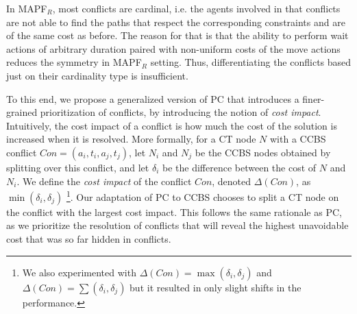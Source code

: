 \documentclass[letterpaper]{article} %
\newcommand{\cbs}{\ac{CBS}\xspace}
\newcommand{\ccbs}{\ac{CCBS}\xspace}
\newcommand{\ct}{\ac{CT}\xspace}
\newcommand{\mapfr}{{MAPF}$_R$\xspace}
\newcommand{\pc}{\ac{PC}\xspace}
\begin{document}
In \mapfr, most conflicts are cardinal, i.e. the agents involved in that conflicts are not able to find the paths that respect the corresponding constraints and are of the same cost as before. The reason for that is that the ability to perform wait actions of arbitrary duration paired with non-uniform costs of the move actions reduces the symmetry in \mapfr setting.
Thus, differentiating the conflicts based just on their cardinality type is insufficient.


To this end, we propose a generalized version of \pc that introduces a finer-grained prioritization of conflicts, by introducing the notion of \emph{cost impact}.
Intuitively, the cost impact of a conflict is how much the cost of the solution is increased when it is resolved. %
More formally, for a \ct node $N$ with a \ccbs conflict $Con=(a_i, t_i, a_j, t_j)$,
let $N_i$ and $N_j$ be the \ccbs nodes obtained by splitting over this conflict,
and let $\delta_i$ be the difference between the cost of $N$ and $N_i$.
We define the \emph{cost impact} of the conflict $Con$, denoted $\Delta(Con)$, as $\min(\delta_i, \delta_j)$  \footnote{We also experimented with $\Delta(Con) = \max(\delta_i, \delta_j)$ and $\Delta(Con) = \sum(\delta_i, \delta_j)$ but it resulted in only  slight shifts in the performance.}.
Our adaptation of \pc to \ccbs chooses to split a \ct node on the conflict with the largest cost impact. This follows the same rationale as \pc, as we prioritize the resolution of conflicts that will
reveal the highest unavoidable cost that was so far hidden in conflicts.





\end{document}
